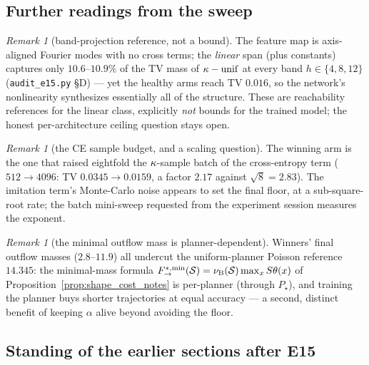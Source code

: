 \documentclass[11pt]{article}
\theoremstyle{definition}
\theoremstyle{remark}
\newtheorem{remark}[theorem]{Remark}
\begin{document}
\subsection{Further readings from the sweep}\label{sec:e15_remarks_notes}

\begin{remark}[band-projection reference, not a bound]\label{rem:band_reference_notes}
The feature map is axis-aligned Fourier modes with no cross terms; the \emph{linear}
span (plus constants) captures only $10.6$--$10.9\%$ of the TV mass of
$\kappa-\mathrm{unif}$ at every band $h\in\{4,8,12\}$ (\texttt{audit\_e15.py} \S D) ---
yet the healthy arms reach TV $0.016$, so the network's nonlinearity synthesizes
essentially all of the structure. These are reachability references for the linear
class, explicitly \emph{not} bounds for the trained model; the honest per-architecture
ceiling question stays open.
\end{remark}

\begin{remark}[the CE sample budget, and a scaling question]\label{rem:batch_notes}
The winning arm is the one that raised eightfold the $\kappa$-sample batch of the
cross-entropy term ($512\rightarrow4096$: TV $0.0345\rightarrow0.0159$, a factor $2.17$
against $\sqrt8=2.83$). The imitation term's Monte-Carlo noise appears to set the final
floor, at a sub-square-root rate; the batch mini-sweep requested from the experiment
session measures the exponent.
\end{remark}

\begin{remark}[the minimal outflow mass is planner-dependent]\label{rem:planner_mass_notes}
Winners' final outflow masses ($2.8$--$11.9$) all undercut the uniform-planner Poisson
reference $14.345$: the minimal-mass formula
$F^{*,\min}_{\rightarrow}(\mathcal S)=\nu_{\mathrm{B}}(\mathcal S)\max_xS\theta(x)$ of
Proposition~\ref{prop:shape_cost_notes} is per-planner (through $P_\star$), and training the
planner buys shorter trajectories at equal accuracy --- a second, distinct benefit of
keeping $\alpha$ alive beyond avoiding the floor.
\end{remark}

\subsection{Standing of the earlier sections after E15}\label{sec:e15_standing_notes}
\end{document}
